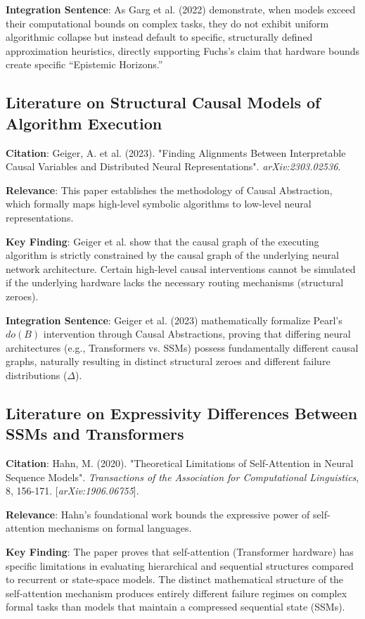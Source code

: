 \documentclass{article}
\begin{document}
\textbf{Integration Sentence}: As Garg et al. (2022) demonstrate, when models exceed their computational bounds on complex tasks, they do not exhibit uniform algorithmic collapse but instead default to specific, structurally defined approximation heuristics, directly supporting Fuchs's claim that hardware bounds create specific ``Epistemic Horizons.''

\subsection{Literature on Structural Causal Models of Algorithm Execution}
\textbf{Citation}: Geiger, A. et al. (2023). "Finding Alignments Between Interpretable Causal Variables and Distributed Neural Representations". \textit{arXiv:2303.02536}.

\textbf{Relevance}: This paper establishes the methodology of Causal Abstraction, which formally maps high-level symbolic algorithms to low-level neural representations.

\textbf{Key Finding}: Geiger et al. show that the causal graph of the executing algorithm is strictly constrained by the causal graph of the underlying neural network architecture. Certain high-level causal interventions cannot be simulated if the underlying hardware lacks the necessary routing mechanisms (structural zeroes).

\textbf{Integration Sentence}: Geiger et al. (2023) mathematically formalize Pearl's $do(B)$ intervention through Causal Abstractions, proving that differing neural architectures (e.g., Transformers vs. SSMs) possess fundamentally different causal graphs, naturally resulting in distinct structural zeroes and different failure distributions ($\Delta$).

\subsection{Literature on Expressivity Differences Between SSMs and Transformers}
\textbf{Citation}: Hahn, M. (2020). "Theoretical Limitations of Self-Attention in Neural Sequence Models". \textit{Transactions of the Association for Computational Linguistics}, 8, 156-171. [\textit{arXiv:1906.06755}].

\textbf{Relevance}: Hahn's foundational work bounds the expressive power of self-attention mechanisms on formal languages.

\textbf{Key Finding}: The paper proves that self-attention (Transformer hardware) has specific limitations in evaluating hierarchical and sequential structures compared to recurrent or state-space models. The distinct mathematical structure of the self-attention mechanism produces entirely different failure regimes on complex formal tasks than models that maintain a compressed sequential state (SSMs).
\end{document}

